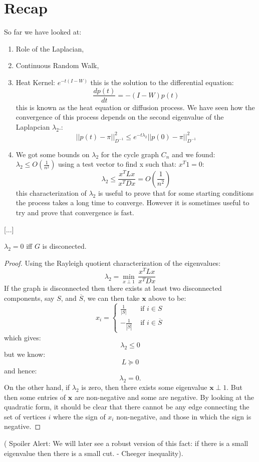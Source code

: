 \documentclass[11pt]{article}
\begin{document}

\section*{Recap}
So far we have looked at:
\begin{enumerate}
    \item Role of the Laplacian,
    \item Continuous Random Walk,
    \item Heat Kernel: $e^{-t(I-W)}$ this is the solution to the differential equation:
    \[
        \frac{dp(t)}{dt} = -(I-W)p(t)
    \]
    this is known as the heat equation or diffusion process.
    We have seen how the convergence of this process depends on the second eigenvalue of the Laplapcian $\lambda_2$.:
    \[
        ||p(t) - \pi||_{D^{-1}}^2 \leq e^{-t\lambda_2}||p(0)- \pi||_{D^{-1}}^2
    \]
    \item We got some bounds on $\lambda_2$ for the cycle graph $C_n$ and we found: $\lambda_2 \leq O(\frac{1}{n^2})$ using a test vector to find x such that: $x^T1 = 0$:
    \[
        \lambda_2 \leq \frac{x^TLx}{x^TDx} = O\left(\frac{1}{n^2}\right)
    \]
    this characterization of $\lambda_2$ is useful to prove that for some starting conditions the process takes a long time to converge. However it is sometimes useful to try and prove that convergence is fast.
\end{enumerate}
    [...]
    
    \begin{lemma}
    $\lambda_2 =0 $ iff $G$ is disconected.
    \end{lemma}
    \begin{proof}
    Using the Rayleigh quotient characterization of the eigenvalues:
    \[
        \lambda_2 = \underset{x \perp 1}{\min}\,\frac{x^TLx}{x^TDx} 
    \]
    If the graph is disconnected then there exists at least two disconnected components, say $S$, and $\overline{S}$, we can then take $\mathbf{x}$ above to be:
    \[
        x_i = \begin{cases}\frac{1}{|S|} & \text{ if } i \in S\\
       - \frac{1}{|\overline{S}|}& \text{ if } i \in \overline{S}
        \end{cases}
    \]
    which gives:
    \[
        \lambda_2 \leq 0
    \]
    but we know:
    \[
        L \succeq 0
    \]
    and hence:
    \[
        \lambda_2 = 0.
    \]
    On the other hand, if $\lambda_2$ is zero, then there exists some eigenvalue $\mathbf{x} \perp 1$.  But then some entries of $\mathbf{x}$ are non-negative and some are negative. By looking at the quadratic form, it should be clear that there cannot be any edge connecting the set of vertices $i$ where the sign of $x_i$ non-negative, and those in which the sign is negative.
    \end{proof}
    ({\color{red} Spoiler Alert:} We will later see a robust version of this fact: if there is a small eigenvalue then there is a small cut. - Cheeger inequality).
\end{document}

